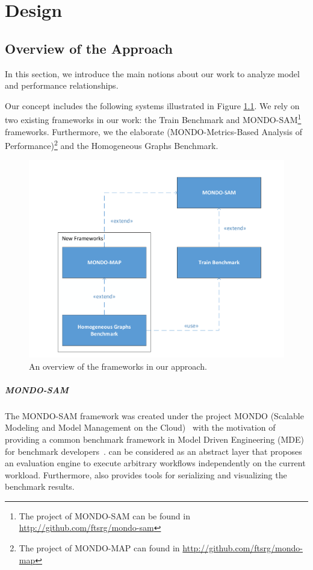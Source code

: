 \chapter{Design}\label{chapter:design}

\section{Overview of the Approach}

In this section, we introduce the main notions about our work to analyze model and performance relationships.

Our concept includes the following systems illustrated in Figure \ref{fig:frameworks}. We rely on two existing frameworks in our work: the Train Benchmark and MONDO-SAM\footnote{The project of MONDO-SAM can be found in \url{http://github.com/ftsrg/mondo-sam}} frameworks. Furthermore, we the elaborate \framework (MONDO-Metrics-Based Analysis of Performance)\footnote{The project of MONDO-MAP can found in \url{http://github.com/ftsrg/mondo-map}} and the Homogeneous Graphs Benchmark.

\begin{figure}[!ht]
	\centering
	\includegraphics[width=130mm, keepaspectratio]{figures/frameworks.pdf}
	\caption{An overview of the frameworks in our approach.}
	\label{fig:frameworks}
\end{figure}

\paragraph{MONDO-SAM}
The MONDO-SAM framework was created under the project MONDO (Scalable Modeling and Model Management on the Cloud)~\cite{mondo} with the motivation of providing a common benchmark framework in Model Driven Engineering (MDE) for benchmark developers~\cite{mondo-sam}. \sam can be considered as an abstract layer that proposes an evaluation engine to execute arbitrary workflows independently on the current workload. Furthermore, \sam also provides tools for serializing and visualizing the benchmark results.

